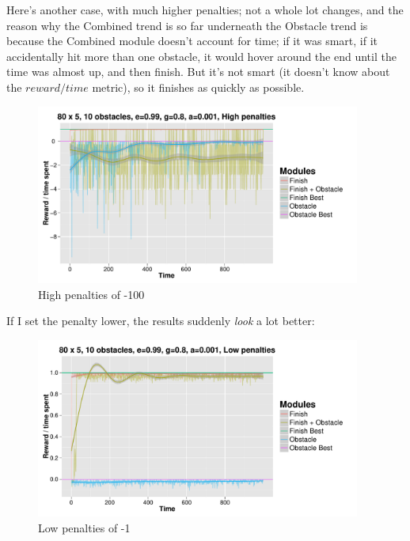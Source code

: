 \documentclass[11pt]{report}
\begin{document}
Here's another case, with much higher penalties; not a whole lot changes, and the reason why the Combined trend is so far underneath the Obstacle trend is because the Combined module doesn't account for time; if it was smart, if it accidentally hit more than one obstacle, it would hover around the end until the time was almost up, and then finish. But it's not smart (it doesn't know about the $reward / time$ metric), so it finishes as quickly as possible.

\begin{figure}[H]
  \centering
  \includegraphics[width=0.95\textwidth]{results/qlearn-s80x5-o10-e0-99-a0-001-g0-8-high.pdf}
  \caption{High penalties of -100}
\end{figure}

\noindent If I set the penalty lower, the results suddenly \emph{look} a lot better:

\begin{figure}[H]
  \centering
  \includegraphics[width=0.95\textwidth]{results/qlearn-s80x5-o10-e0-99-a0-001-g0-8-low.pdf}
  \caption{Low penalties of -1}
\end{figure}
\end{document}
